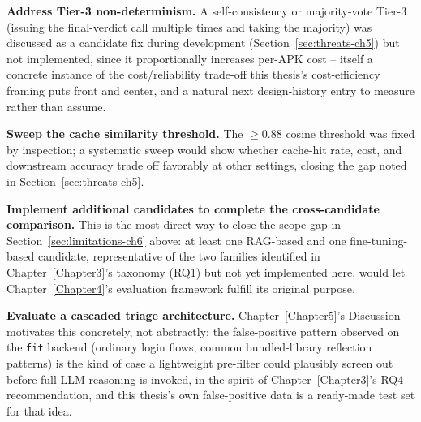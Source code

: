 \textbf{Address Tier-3 non-determinism.} A self-consistency or
majority-vote Tier-3 (issuing the final-verdict call multiple times and
taking the majority) was discussed as a candidate fix during development
(Section~\ref{sec:threats-ch5}) but not implemented, since it
proportionally increases per-APK cost -- itself a concrete instance of the
cost/reliability trade-off this thesis's cost-efficiency framing puts
front and center, and a natural next design-history entry to measure
rather than assume.

\textbf{Sweep the cache similarity threshold.} The $\geq 0.88$ cosine
threshold was fixed by inspection; a systematic sweep would show whether
cache-hit rate, cost, and downstream accuracy trade off favorably at other
settings, closing the gap noted in Section~\ref{sec:threats-ch5}.

\textbf{Implement additional candidates to complete the cross-candidate
comparison.} This is the most direct way to close the scope gap in
Section~\ref{sec:limitations-ch6} above: at least one RAG-based and one
fine-tuning-based candidate, representative of the two families identified
in Chapter~\ref{Chapter3}'s taxonomy (RQ1) but not yet implemented here,
would let Chapter~\ref{Chapter4}'s evaluation framework fulfill its
original purpose.

\textbf{Evaluate a cascaded triage architecture.} Chapter~\ref{Chapter5}'s
Discussion motivates this concretely, not abstractly: the false-positive
pattern observed on the \texttt{fit} backend (ordinary login flows,
common bundled-library reflection patterns) is the kind of case a
lightweight pre-filter could plausibly screen out before full LLM
reasoning is invoked, in the spirit of Chapter~\ref{Chapter3}'s RQ4
recommendation, and this thesis's own false-positive data is a ready-made
test set for that idea.
